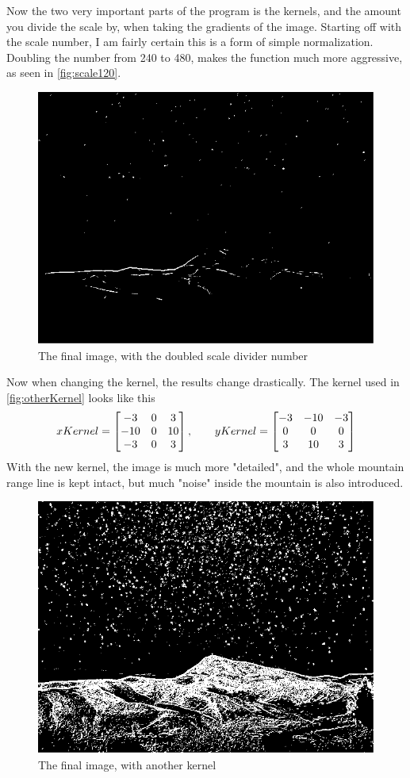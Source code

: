 Now the two very important parts of the program is the kernels, and the amount you divide the scale by, when taking the gradients of the image.
Starting off with the scale number, I am fairly certain this is a form of simple normalization. Doubling the number from 240 to 480, makes the function much more aggressive, as seen in \autoref{fig:scale120}.
\begin{figure}[H]
	\centering
	\includegraphics[width=0.6\linewidth]{figure/scale120}
	\caption{The final image, with the doubled scale divider number}
	\label{fig:scale120}
\end{figure}
Now when changing the kernel, the results change drastically. The kernel used in \autoref{fig:otherKernel} looks like this
\[
xKernel = 
\begin{bmatrix}
-3 & 0 & 3\\
-10 & 0 & 10\\
-3 & 0 & 3
\end{bmatrix},\hspace{0.7cm}
yKernel = 
\begin{bmatrix}
-3 & -10 & -3\\
0 & 0 & 0\\
3 & 10 & 3
\end{bmatrix}
\]
With the new kernel, the image is much more "detailed", and the whole mountain range line is kept intact, but much "noise" inside the mountain is also introduced.
\begin{figure}[H]
	\centering
	\includegraphics[width=0.7\linewidth]{figure/otherKernel}
	\caption{The final image, with another kernel}
	\label{fig:otherKernel}
\end{figure}